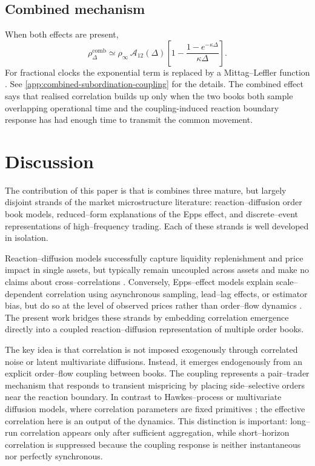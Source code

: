 \documentclass[5p,final]{elsarticle}
\begin{document}
\subsection{Combined mechanism}

When both effects are present,
\begin{equation}
 \rho_\Delta^{\mathrm{comb}}
 \simeq
 \rho_\infty \, \mathcal{A}_{12}(\Delta)
 \left[1-\frac{1-e^{-\kappa\Delta}}{\kappa\Delta}\right].
\end{equation}
For fractional clocks the exponential term is replaced by a Mittag--Leffler function \cite{Haubold2011MittagLeffler}. See \ref{app:combined-subordination-coupling} for the details. The combined effect says that realised correlation builds up only when the two books both sample overlapping operational time and the coupling-induced reaction boundary response has had enough time to transmit the common movement.

\section{Discussion}
\label{sec:discussion}

The contribution of this paper is that is combines three mature, but largely disjoint strands of the market microstructure literature: reaction--diffusion order book models, reduced--form explanations of the Epps effect, and discrete--event representations of high--frequency trading. Each of these strands is well developed in isolation. 

Reaction--diffusion models successfully capture liquidity replenishment and price impact in single assets, but typically remain uncoupled across assets and make no claims about cross--correlations \citep{donier2015,toth2011,benzaquen2018}. Conversely, Epps--effect models explain scale--dependent correlation using asynchronous sampling, lead--lag effects, or estimator bias, but do so at the level of observed prices rather than order--flow dynamics \citep{epps1979,lo1990,hayashi2005,mastromatteo2011}. The present work bridges these strands by embedding correlation emergence directly into a coupled reaction--diffusion representation of multiple order books.

The key idea is that correlation is not imposed exogenously through correlated noise or latent multivariate diffusions. Instead, it emerges endogenously from an explicit order--flow coupling between books. The coupling represents a pair--trader mechanism that responds to transient mispricing by placing side--selective orders near the reaction boundary. In contrast to Hawkes--process or multivariate diffusion models, where correlation parameters are fixed primitives \citep{bacry2015,gatheral2012}; the effective correlation here is an output of the dynamics. This distinction is important: long--run correlation appears only after sufficient aggregation, while short--horizon correlation is suppressed because the coupling response is neither instantaneous nor perfectly synchronous.
\end{document}
